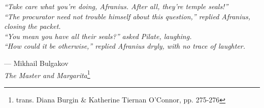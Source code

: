 
\vspace*{\fill}
    \noindent
    {\itshape\footnotesize 
       ``Take care what you're doing, Afranius. After all, they're temple seals!'' \\
       ``The procurator need not trouble himself about this question,'' replied Afranius, closing the packet. \\ ``You mean you have all their seals?'' asked Pilate, laughing. \\ 
       ``How could it be otherwise,'' replied Afranius dryly, with no trace of laughter. 
    }
    \vspace{2em}

    \noindent\hfill\hspace*{-1.5em}
    {{\large --- Mikhail Bulgakov} \\}
    \vspace{1em}
    \noindent\hfill\hspace*{-1.5em}
    {\textit{The Master and Margarita}\footnote{trans. Diana Burgin \& Katherine Tiernan O'Connor, pp. 275-276}}
\vspace*{\fill}

